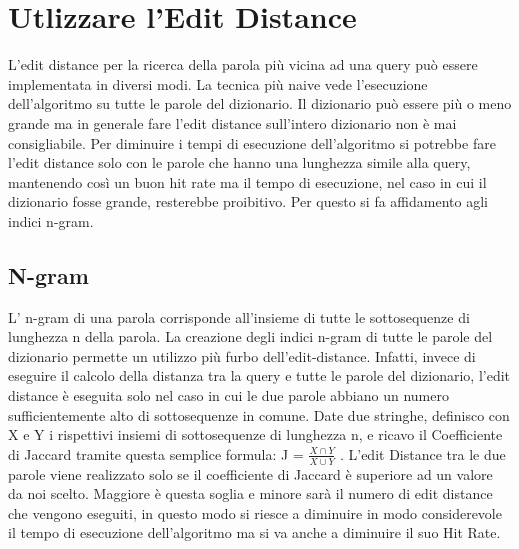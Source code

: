\documentclass{article}
\begin{document}
\section{Utlizzare l'Edit Distance}
L'edit distance per la ricerca della parola più vicina ad una query può essere implementata in diversi modi. La tecnica più naive vede l'esecuzione dell'algoritmo su tutte le parole del dizionario. Il dizionario può essere più o meno grande ma in generale fare l'edit distance sull'intero dizionario non è mai consigliabile. Per diminuire i tempi di esecuzione dell'algoritmo si potrebbe fare l'edit distance solo con le parole che hanno una lunghezza simile alla query, mantenendo così un buon hit rate ma il tempo di esecuzione, nel caso in cui il dizionario fosse grande, resterebbe proibitivo. Per questo si fa affidamento agli indici n-gram.
\subsection{N-gram}
L' n-gram di una parola corrisponde all'insieme di tutte le sottosequenze di lunghezza n della parola.
La creazione degli indici n-gram di tutte le parole del dizionario permette un utilizzo più furbo dell'edit-distance. Infatti, invece di eseguire il calcolo della distanza tra la query e tutte le parole del dizionario, l'edit distance è eseguita solo nel caso in cui le due parole abbiano un numero sufficientemente alto di sottosequenze in comune. Date due stringhe, definisco con X e Y i rispettivi insiemi di sottosequenze di lunghezza n, e ricavo il Coefficiente di Jaccard tramite questa semplice formula: J = $\frac{X\cap Y}{X \cup Y}$ . L'edit Distance tra le due parole viene realizzato solo se il coefficiente di Jaccard è superiore ad un valore da noi scelto. Maggiore è questa soglia e minore sarà il numero di edit distance che vengono eseguiti, in questo modo si riesce a diminuire in modo considerevole il tempo di esecuzione dell'algoritmo ma si va anche a diminuire il suo Hit Rate. 
\end{document}
